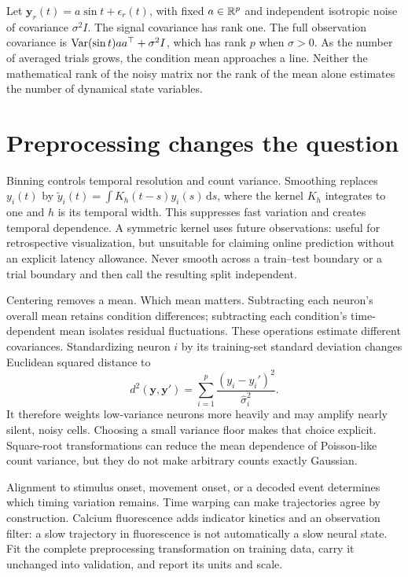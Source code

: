 \begin{example}
Let $\mathbf y_r(t)=a\sin t+\epsilon_r(t)$, with fixed $a\in\mathbb{R}^p$ and independent isotropic noise of covariance $\sigma^2 I$. The signal covariance has rank one. The full observation covariance is $\operatorname{Var}(\sin t)aa^\top+\sigma^2I$, which has rank $p$ when $\sigma>0$. As the number of averaged trials grows, the condition mean approaches a line. Neither the mathematical rank of the noisy matrix nor the rank of the mean alone estimates the number of dynamical state variables.
\end{example}

\section{Preprocessing changes the question}
Binning controls temporal resolution and count variance. Smoothing replaces $y_i(t)$ by $\tilde y_i(t)=\int K_h(t-s)y_i(s)\,\mathrm ds$, where the kernel $K_h$ integrates to one and $h$ is its temporal width. This suppresses fast variation and creates temporal dependence. A symmetric kernel uses future observations: useful for retrospective visualization, but unsuitable for claiming online prediction without an explicit latency allowance. Never smooth across a train--test boundary or a trial boundary and then call the resulting split independent.

Centering removes a mean. Which mean matters. Subtracting each neuron's overall mean retains condition differences; subtracting each condition's time-dependent mean isolates residual fluctuations. These operations estimate different covariances. Standardizing neuron $i$ by its training-set standard deviation changes Euclidean squared distance to
\begin{equation}
 d^2(\mathbf y,\mathbf y')=\sum_{i=1}^p
       \frac{(y_i-y_i')^2}{\hat\sigma_i^2}.
\end{equation}
It therefore weights low-variance neurons more heavily and may amplify nearly silent, noisy cells. Choosing a small variance floor makes that choice explicit. Square-root transformations can reduce the mean dependence of Poisson-like count variance, but they do not make arbitrary counts exactly Gaussian.

Alignment to stimulus onset, movement onset, or a decoded event determines which timing variation remains. Time warping can make trajectories agree by construction. Calcium fluorescence adds indicator kinetics and an observation filter: a slow trajectory in fluorescence is not automatically a slow neural state. Fit the complete preprocessing transformation on training data, carry it unchanged into validation, and report its units and scale.

